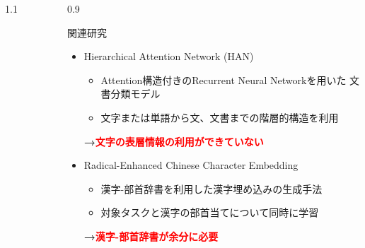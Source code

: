 \documentclass[unicode,10pt]{beamer}
\newlength{\mycolumnwidth}
\newcommand{\arrow}{\textcolor{ttiblue}{\textbf{→}}\hspace{1ex}}
\newcommand{\itemtitle}[1]{#1\\}
\newcommand{\fire}[1]{\textcolor{red}{\textbf{#1}}}
\begin{document}
\begin{frame}[t]
\begin{columns}[onlytextwidth,t]
\begin{column}{1.1\mycolumnwidth}
\begin{figure}
    \end{figure}
  \end{column}
  \begin{column}{0.9\mycolumnwidth}
    \begin{block}{関連研究}
      \begin{itemize}
        \item \itemtitle{Hierarchical Attention Network (HAN) \cite{yang16}}
          \begin{itemize}
            \item Attention構造付きのRecurrent Neural Networkを用いた
                  文書分類モデル
            \item 文字または単語から文、文書までの階層的構造を利用
          \end{itemize}
          \arrow \fire{文字の表層情報の利用ができていない}
        \item \itemtitle{Radical-Enhanced Chinese Character Embedding
                         \cite{sun14}}
          \begin{itemize}
            \item 漢字-部首辞書を利用した漢字埋め込みの生成手法
            \item 対象タスクと漢字の部首当てについて同時に学習
          \end{itemize}
          \arrow \fire{漢字-部首辞書が余分に必要}
      \end{itemize}
    \end{block}
  \end{column}
\end{columns}



\end{frame}
\end{document}
